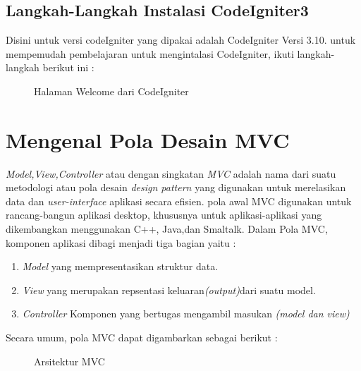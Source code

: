 \subsection{Langkah-Langkah Instalasi CodeIgniter3}
Disini untuk versi codeIgniter yang dipakai adalah CodeIgniter Versi 3.10. untuk mempemudah pembelajaran
untuk mengintalasi CodeIgniter, ikuti langkah-langkah berikut ini :
\begin{figure}[ht]
\caption{Halaman Welcome dari CodeIgniter}
\label{Gambar 1}
\end{figure}

\section {Mengenal Pola Desain MVC}
\textit{Model,View,Controller} atau dengan singkatan \textit {MVC} adalah nama dari suatu metodologi atau pola desain \textit {design pattern} yang digunakan untuk merelasikan data dan \textit{user-interface} aplikasi secara efisien. pola awal MVC digunakan untuk rancang-bangun aplikasi desktop, khususnya untuk aplikasi-aplikasi yang dikembangkan menggunakan C++, Java,dan Smaltalk.
Dalam Pola MVC, komponen aplikasi dibagi menjadi tiga bagian yaitu :
\begin{enumerate}
\item \textit{Model} yang mempresentasikan struktur data.
\item \textit{View} yang merupakan repsentasi keluaran\textit{(output)}dari suatu model.
\item \textit{Controller} Komponen yang bertugas mengambil masukan \textit{(model dan view)}
\end{enumerate}
Secara umum, pola MVC dapat digambarkan sebagai berikut :
\begin{figure}[ht]
\caption{Arsitektur MVC}
\label{Gambar 2}
\end{figure}

